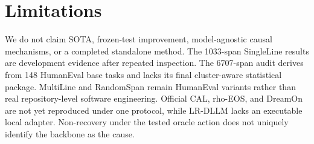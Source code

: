 \section{Limitations}
We do not claim SOTA, frozen-test improvement, model-agnostic causal mechanisms, or a completed standalone method. The 1033-span SingleLine results are development evidence after repeated inspection. The 6707-span audit derives from 148 HumanEval base tasks and lacks its final cluster-aware statistical package. MultiLine and RandomSpan remain HumanEval variants rather than real repository-level software engineering. Official CAL, rho-EOS, and DreamOn are not yet reproduced under one protocol, while LR-DLLM lacks an executable local adapter. Non-recovery under the tested oracle action does not uniquely identify the backbone as the cause.
